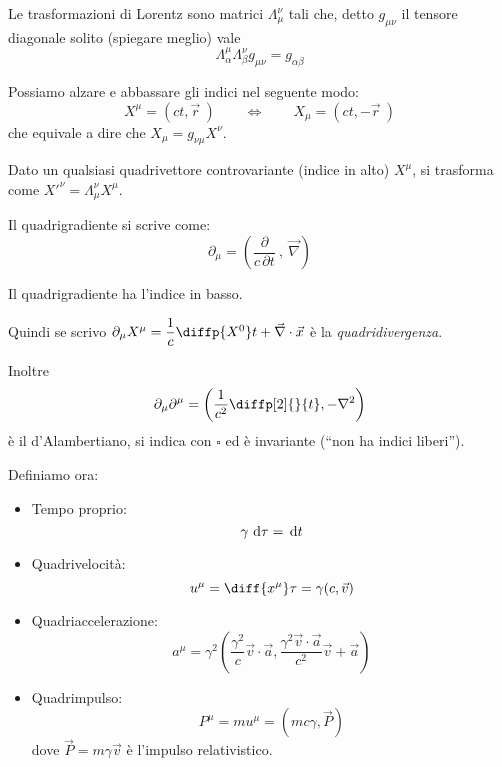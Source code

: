 \documentclass[a4paper,10pt,oneside]{math_article}
\renewcommand{\div}{\vec{\nabla} \cdot}
\newcommand{\grad}{\vec{\nabla}}
\newcommand{\lapl}{{\nabla}^2}
\newcommand{\dalamb}{\square}
\begin{document}
			Le trasformazioni di Lorentz sono matrici $\Lambda_\mu^\nu$ tali che, detto $g_{\mu\nu}$ il tensore diagonale solito (spiegare meglio) vale
			\[
				\Lambda^\mu_\alpha \Lambda^\nu_\beta g_{\mu\nu} = g_{\alpha\beta}
			\]
			
			Possiamo alzare e abbassare gli indici nel seguente modo:
			\[
				X^\mu=\left(ct,\vec r\ \right)\qquad \Longleftrightarrow\qquad X_\mu=\left(ct,-\vec r\ \right)
			\]
			che equivale a dire che $X_\mu=g_{\nu\mu}X^\nu$.
						
			Dato un qualsiasi quadrivettore controvariante (indice in alto) $X^\mu$, si trasforma come $X'^\nu= \Lambda_\mu^\nu X^\mu$.
			
			
			Il quadrigradiente si scrive come:
			\[
				\partial_\mu =\left(\frac{\partial}{c\, \partial t}\ ,\ \grad\right)
			\]
			\begin{Achtung}
					Il quadrigradiente ha l'indice in basso.		
			\end{Achtung}
			
			Quindi se scrivo $\partial_\mu X^\mu = \dfrac1c \diffp {X^0}t + \div \vec x$ è la \emph{quadridivergenza}.
			
			Inoltre 
			\[
				\partial_\mu\partial^\mu = \left(\frac1{c^2}\diffp[2]{}{t}, -\lapl \right) 
			\]
			è il d'Alambertiano, si indica con $\dalamb$ ed è invariante (``non ha indici liberi'').
			
			Definiamo ora:
			\begin{itemize}
				\item Tempo proprio:
					\begin{equation}
						\gamma\, \, \textrm{d} \tau=\, \textrm{d} t
					\end{equation}
				\item Quadrivelocità:
					\begin{equation}
						u^\mu = \diff{x^\mu}\tau = \gamma(c, \vec v)
					\end{equation}
				\item Quadriaccelerazione:
					\begin{equation}
						a^\mu = \gamma^2\left( \frac{\gamma^2}c \vec v \cdot \vec a, \frac{\gamma^2\vec v \cdot \vec a}{c^2} \vec v + \vec a\right)
					\end{equation}
				\item Quadrimpulso:
					\begin{equation}
						P^\mu = mu^\mu = (mc\gamma, \vec P)
					\end{equation}
					dove $\vec P = m\gamma \vec v$ è l'impulso relativistico.	
			\end{itemize}
			
\end{document}
